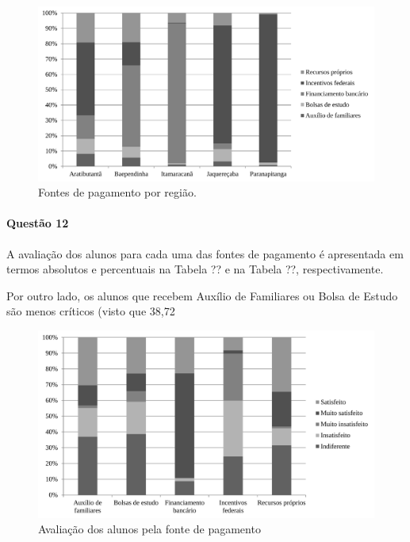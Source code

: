 \documentclass[10pt,a4paper,oneside]{article}
\begin{document}
\begin{figure}
\centering
	\includegraphics[width=0.80\linewidth]{plots/q11}
	\caption{Fontes de pagamento por região.}
	\label{figure: fonte de pagemento}
\end{figure}

\FloatBarrier
\paragraph{Questão 12}

A avaliação dos alunos para cada uma das fontes de pagamento é apresentada em termos absolutos e percentuais na Tabela ?? e na Tabela ??, respectivamente.

Por outro lado, os alunos que recebem Auxílio de Familiares ou Bolsa de Estudo são menos críticos (visto que 38,72%


\begin{figure}
	\centering
	\includegraphics[width=0.80\linewidth]{plots/q12}
	\caption{Avaliação dos alunos pela fonte de pagamento}
	\label{figure: avaliacao por fonte de pagamento}
\end{figure}
\end{document}
